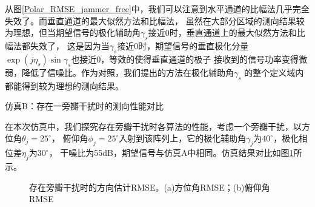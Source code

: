 \documentclass[master]{thesis-uestc}
\begin{document}
从图\ref{Polar_RMSE_jammer_free}中，我们可以注意到水平通道的比幅法几乎完全失效了。而垂直通道的最大似然方法和比幅法，
虽然在大部分区域的测向结果较为理想，但当期望信号的极化辅助角$\gamma_s$接近0时，垂直通道上的最大似然方法和比幅法都失效了，
这是因为当$\gamma_s$接近0时，期望信号的垂直极化分量$\exp(j\eta_s)\sin\gamma_s$也接近0，等效的使得垂直通道的极子
接收到的信号功率变得微弱，降低了信噪比。作为对照，我们提出的方法在极化辅助角$\gamma_s$
的整个定义域内都能得到较为理想的测向结果。

仿真B：存在一旁瓣干扰时的测向性能对比

在本次仿真中，我们探究存在旁瓣干扰时各算法的性能，考虑一个旁瓣干扰，以方位角$\theta_j=25^\circ$，
俯仰角$\phi_j=25^\circ$入射到该阵列上，它的极化辅助角$\gamma_j$为$40^\circ$，极化相位差$\eta_j$为$30^\circ$，
干噪比为55dB，期望信号与仿真A中相同。仿真结果对比如图\ref{Polar_RMSE_SLJ}所示。
\begin{figure}[h]
    \caption{存在旁瓣干扰时的方向估计RMSE。(a)方位角RMSE；(b)俯仰角RMSE}
    \label{Polar_RMSE_SLJ}
\end{figure}
\end{document}
